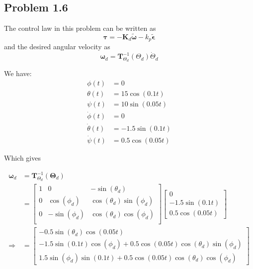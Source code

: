 \subsection*{Problem 1.6}
The control law in this problem can be written as
\begin{equation}
	\boldsymbol{\tau} = -\mathbf{K}_d \tilde{\boldsymbol{\omega}} - k_p \tilde{\boldsymbol{\epsilon}}
\end{equation}
and the desired angular velocity as
\begin{equation}
	\boldsymbol{\omega}_d = \mathbf{T}^{-1}_{\Theta_d}(\Theta_d)\dot{\Theta}_d
\end{equation}

We have: \\
\begin{align}
    {\phi}(t) &= 0 \\
    {\theta}(t) &= 15\cos(0.1t) \\
    {\psi}(t) &= 10\sin(0.05t) \\
    \dot{\phi}(t) &= 0 \\
    \dot{\theta}(t) &= -1.5\sin(0.1t) \\
    \dot{\psi}(t) &= 0.5\cos(0.05t)
\end{align}

Which gives

\begin{align}
\boldsymbol{\omega}_d &= \boldsymbol{T}^{-1}_{\Theta_d}(\boldsymbol{\Theta}_d) \\ 
&= 
\begin{bmatrix}
    1 & 0 & -\sin(\theta_d) \\
    0 & \cos(\phi_d) & \cos(\theta_d)\sin(\phi_d) \\
    0 & -\sin(\phi_d) & \cos(\theta_d)\cos(\phi_d) \\
\end{bmatrix}
\begin{bmatrix}
    0 \\
    -1.5\sin(0.1t) \\
    0.5\cos(0.05t)
\end{bmatrix} \\
\Rightarrow &= 
\begin{bmatrix}
    -0.5\sin(\theta_d)\cos(0.05t) \\
    - 1.5\sin(0.1t)\cos(\phi_d) + 0.5\cos(0.05t)\cos(\theta_d)\sin(\phi_d) \\
    1.5\sin(\phi_d)\sin(0.1t) +0.5\cos(0.05t)\cos(\theta_d)\cos(\phi_d)
\end{bmatrix}
\end{align}

